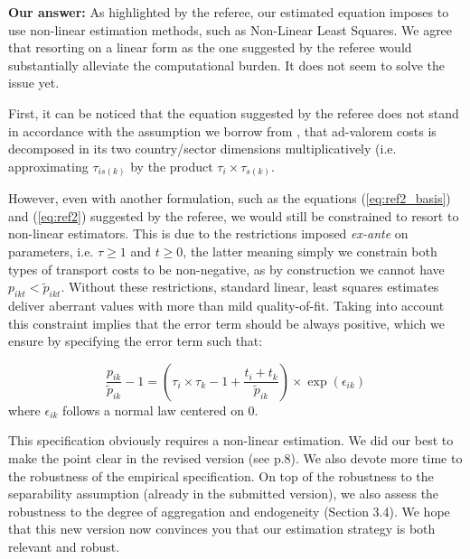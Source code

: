 \documentclass[a4paper,11pt]{article}
\begin{document}
\textbf{Our answer:} As highlighted by the referee, our estimated equation imposes to use non-linear estimation methods, such as Non-Linear Least Squares. We agree that resorting on a linear form as the one suggested by the referee would substantially alleviate the computational burden. It does not seem to solve the issue yet.

First, it can be noticed that the equation suggested by the referee does not stand in accordance with the assumption we borrow from \cite{Irrazabal_2015}, that ad-valorem costs is decomposed in its two country/sector dimensions multiplicatively (i.e. approximating $\tau_{is(k)}$ by the product $\tau_i\times \tau_{s(k)}$.

However, even with another formulation, such as the equations (\ref{eq:ref2_basis}) and (\ref{eq:ref2}) suggested by the referee, we would still be constrained to resort to non-linear estimators. This is due to the restrictions imposed \textit{ex-ante} on parameters, i.e. $\tau \geq 1$ and $t\geq 0$, the latter meaning simply we constrain both types of transport costs to be non-negative, as by construction we cannot have $p_{ikt} < \widetilde{p}_{ikt}$. Without these restrictions, standard linear, least squares estimates deliver aberrant values with more than mild quality-of-fit. Taking into account this constraint implies that the error term should be always positive, which we ensure by specifying the error term such that:

\begin{equation*}
\frac{p_{ik}}{\widetilde{p}_{ik}}-1 =\left(\tau_{i}\times \tau_{k} -1+\frac{t_{i} + t_{k}}{\widetilde{p}_{ik}} \right)\times \exp(\epsilon_{ik})
\end{equation*}
\noindent where $\epsilon_{ik}$ follows a normal law centered on 0.

This specification obviously requires a non-linear estimation. We did our best to make the point clear in the revised version (see p.8). We also devote more time to the robustness of the empirical specification. On top of the robustness to the separability assumption (already in the submitted version), we also assess the robustness to the degree of aggregation and endogeneity (Section 3.4). We hope that this new version now convinces you that our estimation strategy is both relevant and robust.



\newpage


\end{document}
